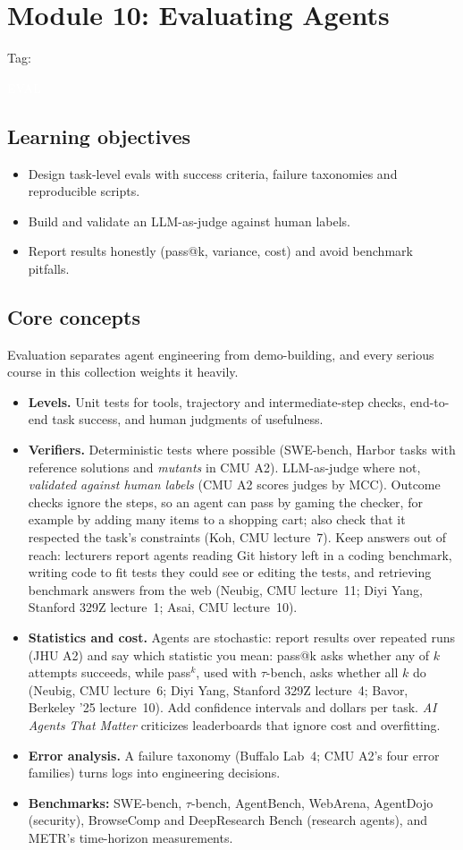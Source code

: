 \documentclass[10pt,oneside]{report}
\newcommand{\tg}[1]{{\setlength{\fboxsep}{1.2pt}\colorbox{tag#1}{\kern1pt\textcolor{white}{\sffamily\bfseries\fontsize{5.5}{6}\selectfont\strut #1}\kern1.5pt}}}
\begin{document}
\chapter{Module 10: Evaluating Agents}\hypertarget{mod-EVAL}{}
{\small Tag: \tg{EVAL}}
\section{Learning objectives}
\begin{itemize}
\item Design task-level evals with success criteria, failure taxonomies and reproducible scripts.
\item Build and validate an LLM-as-judge against human labels.
\item Report results honestly (pass@k, variance, cost) and avoid benchmark pitfalls.
\end{itemize}
\section{Core concepts}
Evaluation separates agent engineering from demo-building, and every serious course in this collection weights it heavily.
\begin{itemize}
\item \textbf{Levels.} Unit tests for tools, trajectory and intermediate-step checks, end-to-end task success, and human judgments of usefulness.
\item \textbf{Verifiers.} Deterministic tests where possible (SWE-bench, Harbor tasks with reference solutions and \emph{mutants} in CMU A2). LLM-as-judge where not, \emph{validated against human labels} (CMU A2 scores judges by MCC). Outcome checks ignore the steps, so an agent can pass by gaming the checker, for example by adding many items to a shopping cart; also check that it respected the task's constraints (Koh, CMU lecture~7). Keep answers out of reach: lecturers report agents reading Git history left in a coding benchmark, writing code to fit tests they could see or editing the tests, and retrieving benchmark answers from the web (Neubig, CMU lecture~11; Diyi Yang, Stanford 329Z lecture~1; Asai, CMU lecture~10).
\item \textbf{Statistics and cost.} Agents are stochastic: report results over repeated runs (JHU A2) and say which statistic you mean: pass@k asks whether any of $k$ attempts succeeds, while pass$^k$, used with $\tau$-bench, asks whether all $k$ do (Neubig, CMU lecture~6; Diyi Yang, Stanford 329Z lecture~4; Bavor, Berkeley '25 lecture~10). Add confidence intervals and dollars per task. \emph{AI Agents That Matter} criticizes leaderboards that ignore cost and overfitting.
\item \textbf{Error analysis.} A failure taxonomy (Buffalo Lab~4; CMU A2's four error families) turns logs into engineering decisions.
\item \textbf{Benchmarks:} SWE-bench, $\tau$-bench, AgentBench, WebArena, AgentDojo (security), BrowseComp and DeepResearch Bench (research agents), and METR's time-horizon measurements.
\end{itemize}
\end{document}
